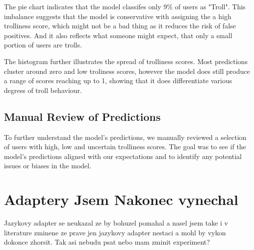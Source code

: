 \documentclass[twoside]{ctuthesis}
\theoremstyle{plain}
\theoremstyle{definition}
\theoremstyle{note}
\begin{document}
The pie chart indicates that the model classifes only 9\% of users as "Troll". This imbalance suggests that the model is conservative with assigning the a high trolliness score, which might not be a bad thing as it reduces the risk of false positives. And it also reflects what someone might expect, that only a small portion of users are trolls.\par
The histogram further illustrates the spread of trolliness scores. Most predictions cluster around zero and low troliness scores, however the model does still produce a range of scores reaching up to 1, showing that it does differentiate various degress of troll behaviour.

\subsection{Manual Review of Predictions}
To further understand the model's predictions, we manually reviewed a selection of users with high, low and uncertain trolliness scores. The goal was to see if the model's predictions aligned with our expectations and to identify any potential issues or biases in the model.\par

\section{Adaptery Jsem Nakonec vynechal}
Jazykovy adapter se neukazal ze by bohuzel pomahal a nasel jsem take i v literature zminene ze prave jen jazykovy adapter nestaci a mohl by vykon dokonce zhorsit. Tak asi nebudu psat nebo mam zminit experiment?

 
\end{document}
